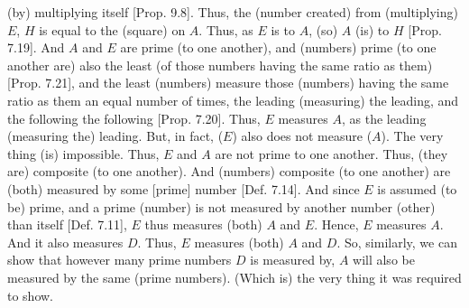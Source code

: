 \begin{Parallel}{}{}
{(by) multiplying itself [Prop. 9.8].  Thus, the (number created) from (multiplying) $E$, $H$ is equal to the (square) on $A$.
Thus, as $E$ is to $A$, (so) $A$ (is) to $H$ [Prop. 7.19]. And $A$ and $E$
 are prime (to one another), and (numbers) prime (to one another are) also the least (of those
numbers having the same ratio as them) [Prop. 7.21],
and the least (numbers) measure those (numbers) having the same ratio  as them an equal number of times, the leading (measuring) the leading, and the
following the following
[Prop. 7.20]. Thus, $E$
measures $A$, as the leading (measuring the) leading. But, in fact, 
($E$) also does not measure ($A$). The very thing (is) impossible. Thus,
$E$ and $A$ are not prime to one another. Thus, (they are) composite (to one another). And (numbers) composite (to one another) are (both) measured
by some [prime] number [Def. 7.14]. And since $E$
is assumed (to be) prime, and a prime (number) is not measured by  another number (other) than itself
[Def. 7.11], $E$ thus measures (both) $A$ and $E$. Hence, $E$ measures $A$. And it also measures $D$. Thus, $E$ measures (both) $A$ and $D$. So, similarly, we can show that however many prime
numbers $D$ is measured by, $A$ will also be measured by the same
(prime numbers). (Which is) the very thing it was required to show.}
\end{Parallel}

